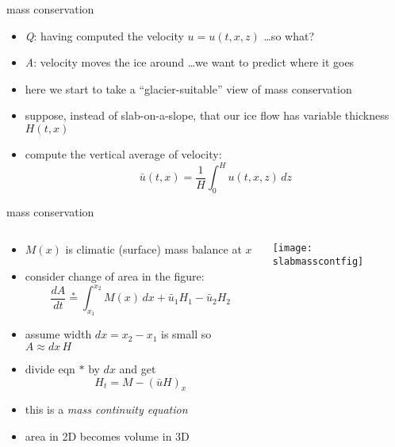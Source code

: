 \begin{frame}{mass conservation}

\begin{itemize}
\item \emph{Q}: having computed the velocity $u=u(t,x,z)$ \dots so what?
\item<2> \emph{A}: velocity moves the ice around \dots we want to predict where it goes 

\bigskip
\item<2> here we start to take \alert{a ``glacier-suitable'' view of mass conservation}
\item<2> suppose, instead of slab-on-a-slope, that our ice flow has variable thickness $H(t,x)$
\item<2> compute the vertical average of velocity:
	$$\bar u(t,x) = \frac{1}{H}\int_0^{H} u(t,x,z)\,dz$$
\end{itemize}
\end{frame}


\begin{frame}{mass conservation }

\begin{columns}
\begin{column}{0.6\textwidth}
\small
\begin{itemize}
\item $M(x)$ is climatic (surface) mass balance at $x$
\item consider change of area in the figure:
	$$\frac{dA}{dt} \stackrel{\ast}{=} \int_{x_1}^{x_2} M(x)\,dx + \bar u_1 H_1 - \bar u_2 H_2$$
\item assume width $dx=x_2-x_1$ is small so $A\approx dx\, H$
\item divide eqn $\ast$ by $dx$ and get
   $$H_t = M - \left(\bar u H\right)_x$$
\item this is a \emph{mass continuity equation}
\item area in 2D becomes volume in 3D
\end{itemize}
\end{column}
\begin{column}{0.4\textwidth}
\texttt{[image: slabmasscontfig]}
\end{column}
\end{columns}

\end{frame}


